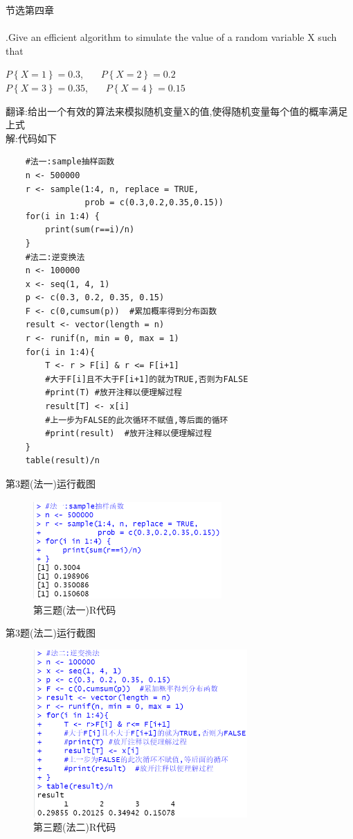 \documentclass{book}
\begin{document}
\centering
节选第四章 \\

\hspace*{\fill} \\
\justifying
{}.Give an efficient algorithm to simulate the value of a random variable X such that
\begin{center}
  $P\left\{X=1\right\} = 0.3$, \ \ \ $P\left\{X=2\right\} = 0.2$ \\
  $P\left\{X=3\right\} = 0.35$, \ \ \ $P\left\{X=4\right\} = 0.15$ \\
\end{center}
\noindent
翻译:给出一个有效的算法来模拟随机变量X的值,使得随机变量每个值的概率满足上式 \\
解:代码如下
\lstset{language = R}
\begin{lstlisting}
    #法一:sample抽样函数
    n <- 500000
    r <- sample(1:4, n, replace = TRUE, 
                prob = c(0.3,0.2,0.35,0.15))
    for(i in 1:4) {
        print(sum(r==i)/n)
    }
    #法二:逆变换法
    n <- 100000  
    x <- seq(1, 4, 1) 
    p <- c(0.3, 0.2, 0.35, 0.15)
    F <- c(0,cumsum(p))  #累加概率得到分布函数
    result <- vector(length = n)  
    r <- runif(n, min = 0, max = 1)
    for(i in 1:4){  
        T <- r > F[i] & r <= F[i+1]  
        #大于F[i]且不大于F[i+1]的就为TRUE,否则为FALSE
        #print(T) #放开注释以便理解过程
        result[T] <- x[i] 
        #上一步为FALSE的此次循环不赋值,等后面的循环
        #print(result)  #放开注释以便理解过程
    }
    table(result)/n  
\end{lstlisting}
第3题(法一)运行截图
\begin{figure}[H]
  \centering
  \includegraphics*[height = 3.8cm, width = 7.2cm]{gramFile/第三题(法一)运行截图.PNG}
  \caption{第三题(法一)R代码}
\end{figure}
第3题(法二)运行截图
\begin{figure}[H]
  \centering
  \includegraphics*[height = 6.4cm, width = 8.2cm]{gramFile/第三题(法二)运行截图.PNG}
  \caption{第三题(法二)R代码}
\end{figure}
\end{document}
